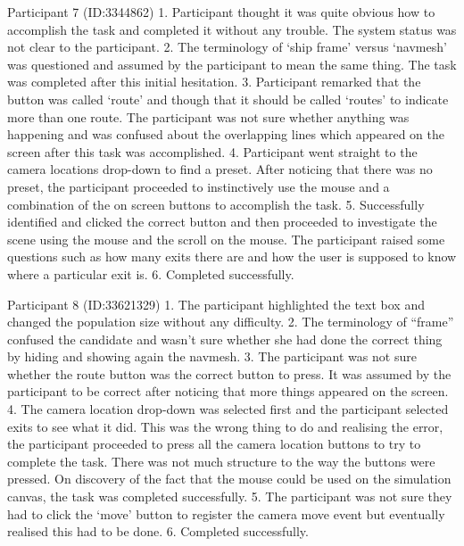 Participant 7 (ID:3344862)
1. Participant thought it was quite obvious how to accomplish the task and completed it without any trouble. The system status was not clear to the participant.
2. The terminology of ‘ship frame’ versus ‘navmesh’ was questioned and assumed by the participant to mean the same thing. The task was completed after this initial hesitation.
3. Participant remarked that the button was called ‘route’ and though that it should be called ‘routes’ to indicate more than one route. The participant was not sure whether anything was happening and was confused about the overlapping lines which appeared on the screen after this task was accomplished.
4. Participant went straight to the camera locations drop-down to find a preset. After noticing that there was no preset, the participant proceeded to instinctively use the mouse and a combination of the on screen buttons to accomplish the task.
5. Successfully identified and clicked the correct button and then proceeded to investigate the scene using the mouse and the scroll on the mouse. The participant raised some questions such as how many exits there are and how the user is supposed to know where a particular exit is.
6. Completed successfully.

Participant 8 (ID:33621329)
1. The participant highlighted the text box and changed the population size without any difficulty.
2. The terminology of “frame” confused the candidate and wasn’t sure whether she had done the correct thing by hiding and showing again the navmesh.
3. The participant was not sure whether the route button was the correct button to press. It was assumed by the participant to be correct after noticing that more things appeared on the screen.
4. The camera location drop-down was selected first and the participant selected exits to see what it did. This was the wrong thing to do and realising the error, the participant proceeded to press all the camera location buttons to try to complete the task. There was not much structure to the way the buttons were pressed. On discovery of the fact that the mouse could be used on the simulation canvas, the task was completed successfully.
5. The participant was not sure they had to click the ‘move’ button to register the camera move event but eventually realised this had to be done.
6. Completed successfully. 

%
